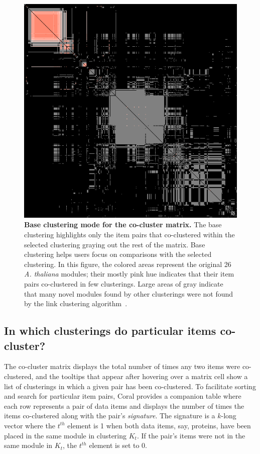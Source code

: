 \documentclass[12pt]{cmuthesis}
\newcommand\Coral{Coral\xspace}
\newcommand{\Athal}{\textit{A. thaliana}\xspace}
\begin{document}
  \begin{figure}[!htb]
    \centering
    \includegraphics[width=0.7\linewidth]{figures/coral_base_matrix}
    \caption{\textbf{Base clustering mode for the co-cluster matrix.} The base clustering highlights only the item pairs that co-clustered within the selected clustering graying out the rest of the matrix. Base clustering helps users focus on comparisons with the selected clustering. In this figure, the colored areas represent the original 26 \Athal modules; their mostly pink hue indicates that their item pairs co-clustered in few clusterings. Large areas of gray indicate that many novel modules found by other clusterings were not found by the link clustering algorithm~\cite{Ahn2010}.}
    \label{fig:coral:base_clust}
  \end{figure}

  \subsection{In which clusterings do particular items co-cluster?}
  \label{sec:pairs_table}

  The co-cluster matrix displays the total number of times any two items were co-clustered, and the tooltips that appear after hovering over a matrix cell show a list of clusterings in which a given pair has been co-clustered. To facilitate sorting and search for particular item pairs, \Coral provides a companion table where each row represents a pair of data items and displays the number of times the items co-clustered along with the pair's \textit{signature}. The signature is a $k$-long vector where the $t^{th}$ element is 1 when both data items, say, proteins, have been placed in the same module in clustering $K_{t}$. If the pair's items were not in the same module in $K_{t}$, the $t^{th}$ element is set to 0.
\end{document}

